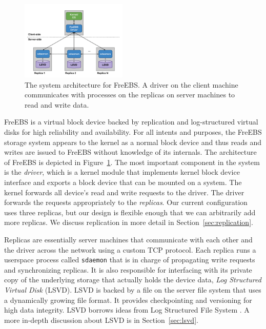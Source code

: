 \begin{figure}[b!]
    \includegraphics[width=0.45\textwidth]{./figures/systemarch.pdf}    
    \caption{The system architecture for FreEBS. A driver on the client 
            machine communicates with processes on the replicas on server 
            machines to read and write data.}
    \label{fig:architecture}
\end{figure}


FreEBS is a virtual block device backed by replication and log-structured
virtual disks for high reliability and availability. For all intents and 
purposes, the FreEBS storage system appears to the kernel as a normal block
device and thus reads and writes are issued to FreEBS without knowledge of 
its internals. The architecture of FreEBS is depicted in 
Figure~\ref{fig:architecture}. The most important component in
the system is the \emph{driver}, which is a kernel module that implements
kernel block device interface and exports a block device that can be mounted
on a system. The kernel forwards all device's read and write requests to the
driver. The driver forwards the requests appropriately to the 
\emph{replicas}. Our current configuration uses three replicas, but our 
design is flexible enough that we can arbitrarily add more replicas. We 
discuss replication in more detail in Section~\ref{sec:replication}.

Replicas are essentially server machines that communicate with each other 
and the driver across the network using a custom TCP protocol. Each replica 
runs a userspace process called \texttt{sdaemon} that is in 
charge of propagating write requests and synchronizing replicas. It is also
responsible for interfacing with its private copy of the underlying storage 
that actually holds the device data, \emph{Log Structured Virtual Disk}
(LSVD). LSVD is backed by a file on the server file system that uses a 
dynamically growing file format. It provides checkpointing and versioning 
for high data integrity. LSVD borrows ideas from Log Structured File System \cite{lfs}. A more in-depth discussion about LSVD is in Section~\ref{sec:lsvd}.